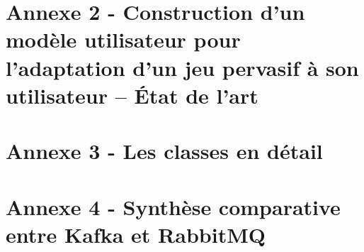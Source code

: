 \documentclass{article}
\begin{document}
\section{Annexe 2 - Construction d’un modèle utilisateur pour l’adaptation d’un jeu pervasif à son utilisateur – État de l’art}\label{ann:eda}

\section{Annexe 3 - Les classes en détail}\label{ann:detailclasse}

\section{Annexe 4 - Synthèse comparative entre Kafka et RabbitMQ}%
		



\end{document}
